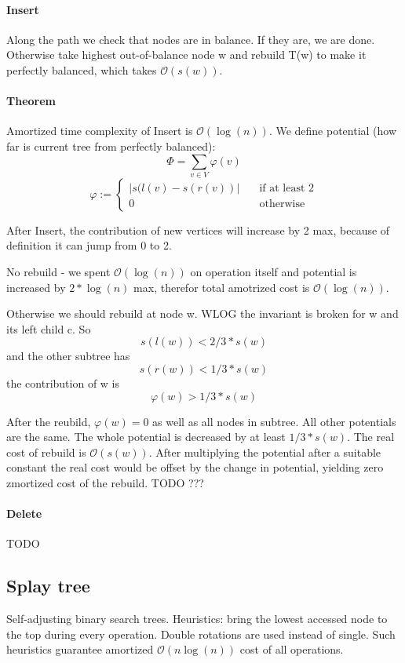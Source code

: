 \documentclass[12pt]{article}
\newcommand{\bigO}{\mathcal{O}}
\begin{document}
\paragraph{Insert} Along the path we check that nodes are in balance. If they are, we are done. Otherwise take highest out-of-balance node w and rebuild T(w) to make it perfectly balanced, which takes $ \bigO(s(w)) $.

\paragraph{Theorem} Amortized time complexity of Insert is $ \bigO(\log(n)) $.
We define potential (how far is current tree from perfectly balanced):
\[ \Phi =  \sum_{v \in V} \varphi(v)\]
\[ \varphi :=
	\begin{cases}
		|  s(l(v) - s(r(v)) | &\quad\text{if at least 2} \\
		\text {0} &\quad\text{otherwise}
	\end{cases}
\]

After Insert, the contribution of new vertices will increase by 2 max, because of definition it can jump from 0 to 2.

No rebuild - we spent $ \bigO(\log(n)) $ on operation itself and potential is increased by $ 2*\log(n) $ max, therefor total amotrized cost is $ \bigO(\log(n)) $.

Otherwise we should rebuild at node w. WLOG the invariant is broken for w and its left child c. So
\[ s(l(w)) < 2/3 * s(w) \]
and the other subtree has
\[ s(r(w)) < 1/3 * s(w) \]
the contribution of w is
\[ \varphi(w) > 1/3 * s(w) \]

After the reubild, $ \varphi(w) = 0 $ as well as all nodes in subtree. All other potentials are the same. The whole potential is decreased by at least $ 1/3 * s(w) $. The real cost of rebuild is $ \bigO(s(w)) $. After multiplying the potential after a suitable constant the real cost would be offset by the change in potential, yielding zero zmortized cost of the rebuild. TODO ???

\paragraph{Delete} TODO


\subsection{Splay tree}

Self-adjusting binary search trees. Heuristics: bring the lowest accessed node to the top during every operation. Double rotations are used instead of single.
Such heuristics guarantee amortized $\bigO(n\log(n))$ cost of all operations.
\end{document}
